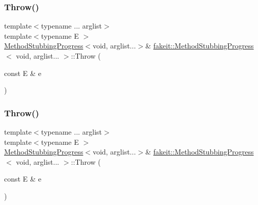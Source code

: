 \mbox{\label{structfakeit_1_1MethodStubbingProgress_3_01void_00_01arglist_8_8_8_01_4_a8b0d920dc6424eadd7dce7cb9df66814}} 
\subsubsection{\texorpdfstring{Throw()}{Throw()}\hspace{0.1cm}{\footnotesize\ttfamily [6/27]}}
{\footnotesize\ttfamily template$<$typename ... arglist$>$ \\
template$<$typename E $>$ \\
\mbox{\hyperlink{structfakeit_1_1MethodStubbingProgress}{Method\+Stubbing\+Progress}}$<$void, arglist...$>$\& \mbox{\hyperlink{structfakeit_1_1MethodStubbingProgress}{fakeit\+::\+Method\+Stubbing\+Progress}}$<$ void, arglist... $>$\+::Throw (\begin{DoxyParamCaption}\item[{const E \&}]{e }\end{DoxyParamCaption})\hspace{0.3cm}{\ttfamily [inline]}}

\mbox{\label{structfakeit_1_1MethodStubbingProgress_3_01void_00_01arglist_8_8_8_01_4_a8b0d920dc6424eadd7dce7cb9df66814}} 
\subsubsection{\texorpdfstring{Throw()}{Throw()}\hspace{0.1cm}{\footnotesize\ttfamily [7/27]}}
{\footnotesize\ttfamily template$<$typename ... arglist$>$ \\
template$<$typename E $>$ \\
\mbox{\hyperlink{structfakeit_1_1MethodStubbingProgress}{Method\+Stubbing\+Progress}}$<$void, arglist...$>$\& \mbox{\hyperlink{structfakeit_1_1MethodStubbingProgress}{fakeit\+::\+Method\+Stubbing\+Progress}}$<$ void, arglist... $>$\+::Throw (\begin{DoxyParamCaption}\item[{const E \&}]{e }\end{DoxyParamCaption})\hspace{0.3cm}{\ttfamily [inline]}}

